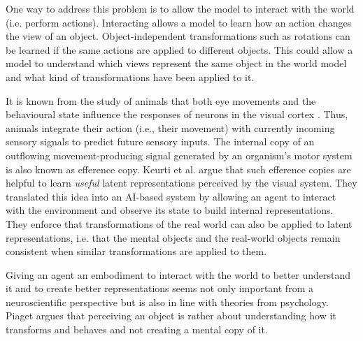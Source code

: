 One way to address this problem is to allow the model to interact with the world (i.e. perform actions). Interacting allows a model to learn how an action changes the view of an object. Object-independent transformations such as rotations can be learned if the same actions are applied to different objects. This could allow a model to understand which views represent the same object in the world model and what kind of transformations have been applied to it.

It is known from the study of animals that both eye movements and the behavioural state influence the responses of neurons in the visual cortex .
Thus, animals integrate their action (i.e., their movement) with currently incoming sensory signals to predict future sensory inputs.
The internal copy of an outflowing movement-producing signal generated by an organism's motor system is also known as efference copy.
Keurti et al.  argue that such efference copies are helpful to learn \emph{useful} latent representations perceived by the visual system.
They translated this idea into an AI-based system by allowing an agent to interact with the environment and observe its state to build internal representations.
They enforce that transformations of the real world can also be applied to latent representations, i.e. that the mental objects and the real-world objects remain consistent when similar transformations are applied to them.

Giving an agent an embodiment to interact with the world to better understand it and to create better representations seems not only important from a neuroscientific perspective but is also in line with theories from psychology.
Piaget  argues that perceiving an object is rather about understanding how it transforms and behaves and not creating a mental copy of it.

